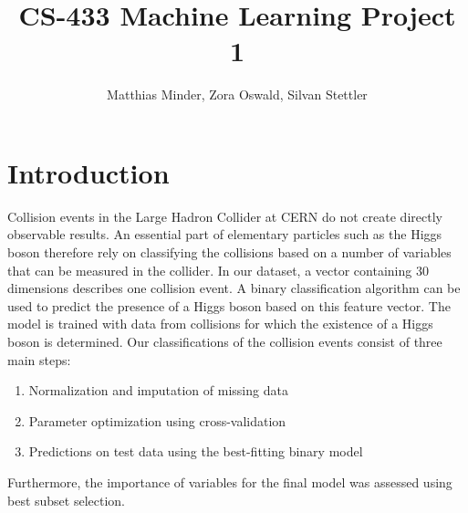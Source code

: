 \documentclass[10pt,conference,compsocconf]{IEEEtran}
\begin{document}
\title{CS-433 Machine Learning Project 1}

\author{
  Matthias Minder, Zora Oswald, Silvan Stettler\\
  
}

\maketitle

\begin{abstract}

\end{abstract}

\section*{Introduction}
Collision events in the Large Hadron Collider at CERN do not create directly observable results. An essential part of elementary particles such as the Higgs boson therefore rely on classifying the collisions based on a number of variables that can be measured in the collider. 
In our dataset, a vector containing 30 dimensions describes one collision event. A binary classification algorithm can be used to predict the presence of a Higgs boson based on this feature vector. The model is trained with data from collisions for which the existence of a Higgs boson is determined.
Our classifications of the collision events consist of three main steps:
\begin{enumerate}
\item Normalization and imputation of missing data 
\item Parameter optimization using cross-validation
\item Predictions on test data using the best-fitting binary model 
\end{enumerate}
Furthermore, the importance of variables for the final model was assessed using best subset selection.
\end{document}
